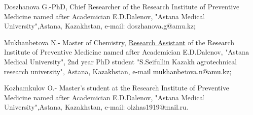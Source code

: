 \begin{info}
Doszhanova G.-PhD, Chief Researcher of the Research Institute of
Preventive Medicine named after Academician E.D.Dalenov, "Astana Medical
University",Astana, Kazakhstan, e-mail: doszhanova.g@amu.kz;

Mukhanbetova N.- Master of Chemistry,
\href{https://context.reverso.net/\%D0\%BF\%D0\%B5\%D1\%80\%D0\%B5\%D0\%B2\%D0\%BE\%D0\%B4/\%D0\%B0\%D0\%BD\%D0\%B3\%D0\%BB\%D0\%B8\%D0\%B9\%D1\%81\%D0\%BA\%D0\%B8\%D0\%B9-\%D1\%80\%D1\%83\%D1\%81\%D1\%81\%D0\%BA\%D0\%B8\%D0\%B9/research+assistant}{Research
Assistant} of the Research Institute of Preventive Medicine named after
Academician E.D.Dalenov, "Astana Medical University", 2nd year PhD
student "S.Seifullin Kazakh agrotechnical research university", Astana,
Kazakhstan, e-mail mukhanbetova.n@amu.kz;

Kozhamkulov O.- Master's student at the Research Institute of Preventive
Medicine named after Academician E.D.Dalenov, "Astana Medical
University",Astana, Kazakhstan, e-mail: olzhas1919@mail.ru.
\end{info}
